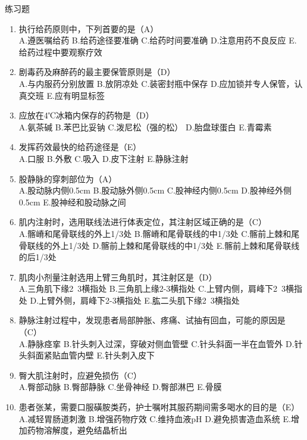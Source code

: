 \documentclass[11pt, a4paper]{ctexart}
\begin{document}
\begin{examplebox}{练习题}
\begin{enumerate}
    \item 执行给药原则中，下列首要的是（A）\\
    A.遵医嘱给药 \quad B.给药途径要准确 \quad C.给药时间要准确 \quad D.注意用药不良反应 \quad E.给药过程中要观察疗效
    \item 剧毒药及麻醉药的最主要保管原则是（D）\\
    A.与内服药分别放置 \quad B.放阴凉处 \quad C.装密封瓶中保存 \quad D.应加锁并专人保管，认真交班 \quad E.应有明显标签
    \item 应放在4℃冰箱内保存的药物是（D）\\
    A.氨茶碱 \quad B.苯巴比妥钠 \quad C.泼尼松（强的松） \quad D.胎盘球蛋白 \quad E.青霉素
    \item 发挥药效最快的给药途径是（E）\\
    A.口服 \quad B.外敷 \quad C.吸入 \quad D.皮下注射 \quad E.静脉注射
    \item 股静脉的穿刺部位为（A）\\
    A.股动脉内侧0.5cm \quad B.股动脉外侧0.5cm \quad C.股神经内侧0.5cm \quad D.股神经外侧0.5cm \quad E.股神经和股动脉之间
    \item 肌内注射时，选用联线法进行体表定位，其注射区域正确的是（C）\\
    A.髂嵴和尾骨联线的外上1/3处 \quad B.髂嵴和尾骨联线的中1/3处 \quad C.髂前上棘和尾骨联线的外上1/3处 \quad D.髂前上棘和尾骨联线的中1/3处 \quad E.髂前上棘和尾骨联线的后1/3处
    \item 肌肉小剂量注射选用上臂三角肌时，其注射区是（D）\\
    A.三角肌下缘2~3横指处 \quad B.三角肌上缘2-3横指处 \quad C.上臂内侧，肩峰下2~3横指处 \quad D.上臂外侧，肩峰下2-3横指处 \quad E.肱二头肌下缘2~3横指处
    \item 静脉注射过程中，发现患者局部肿胀、疼痛、试抽有回血，可能的原因是（C）\\
    A.静脉痉挛 \quad B.针头刺入过深，穿破对侧血管壁 \quad C.针头斜面一半在血管外 \quad D.针头斜面紧贴血管内壁 \quad E.针头刺入皮下
    \item 臀大肌注射时，应避免损伤（C）\\
    A.臀部动脉 \quad B.臀部静脉 \quad C.坐骨神经 \quad D.臀部淋巴 \quad E.骨膜
    \item 患者张某，需要口服磺胺类药，护士嘱咐其服药期间需多喝水的目的是（E）\\
    A.减轻胃肠道刺激 \quad B.增强药物疗效 \quad C.维持血液pH \quad D.避免损害造血系统 \quad E.增加药物溶解度，避免结晶析出

\end{enumerate}
\end{examplebox}
\end{document}
